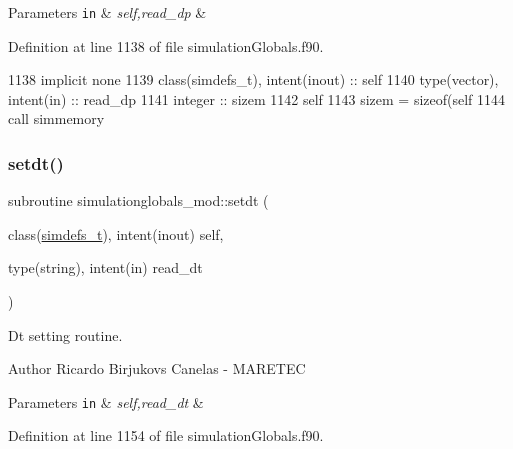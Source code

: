 \begin{DoxyParams}[1]{Parameters}
\mbox{\tt in}  & {\em self,read\+\_\+dp} & \\
\hline
\end{DoxyParams}


Definition at line 1138 of file simulation\+Globals.\+f90.


\begin{DoxyCode}
1138     \textcolor{keywordtype}{implicit none}
1139     \textcolor{keywordtype}{class}(simdefs\_t), \textcolor{keywordtype}{intent(inout)} :: self
1140     \textcolor{keywordtype}{type}(vector), \textcolor{keywordtype}{intent(in)} :: read\_dp
1141     \textcolor{keywordtype}{integer} :: sizem
1142     self%
1143     sizem = sizeof(self%
1144     \textcolor{keyword}{call }simmemory%
\end{DoxyCode}
\mbox{\label{namespacesimulationglobals__mod_a0eced3f4367d08f3d0cb6ef2044bdc56}} 
\subsubsection{\texorpdfstring{setdt()}{setdt()}}
{\footnotesize\ttfamily subroutine simulationglobals\+\_\+mod\+::setdt (\begin{DoxyParamCaption}\item[{class(\mbox{\hyperlink{structsimulationglobals__mod_1_1simdefs__t}{simdefs\+\_\+t}}), intent(inout)}]{self,  }\item[{type(string), intent(in)}]{read\+\_\+dt }\end{DoxyParamCaption})\hspace{0.3cm}{\ttfamily [private]}}



Dt setting routine. 

\begin{DoxyAuthor}{Author}
Ricardo Birjukovs Canelas -\/ M\+A\+R\+E\+T\+EC 
\end{DoxyAuthor}

\begin{DoxyParams}[1]{Parameters}
\mbox{\tt in}  & {\em self,read\+\_\+dt} & \\
\hline
\end{DoxyParams}


Definition at line 1154 of file simulation\+Globals.\+f90.


